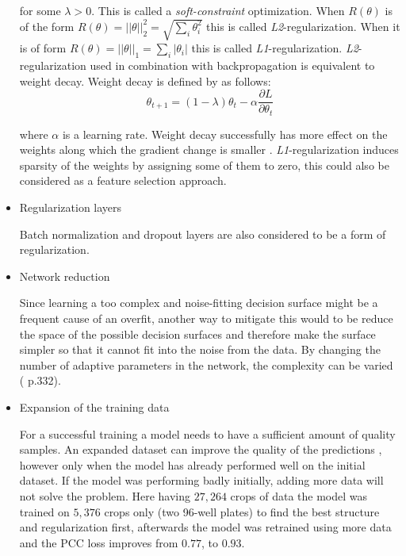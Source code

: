 \begin{itemize}
	for some $\lambda > 0$. This is called a \emph{soft-constraint} optimization. When $R(\theta)$ is of the form $R(\theta) = ||\theta||^2_2 = \sqrt{\sum\limits_i \theta_i^2}$ this is called \emph{L2}-regularization. When it is of form $R(\theta) = ||\theta||_1 = \sum\limits_i |\theta_i|$ this is called \emph{L1}-regularization. \emph{L2}-regularization used in combination with backpropagation is equivalent to weight decay. Weight decay is defined by \cite{Hanson_1988} as follows:
	\begin{equation}
		\theta_{t+1} = (1 - \lambda)\theta_t - \alpha \frac{\partial L}{\partial \theta_t}
	\end{equation}

	where $\alpha$ is a learning rate. Weight decay successfully has more effect on the weights along which the gradient change is smaller \cite{Goodfellow_2016}. \emph{L1}-regularization induces sparsity of the weights by assigning some of them to zero, this could also be considered as a feature selection approach.

	\item Regularization layers

	Batch normalization and dropout layers are also considered to be a form of regularization.

	\item Network reduction

	Since learning a too complex and noise-fitting decision surface might be a frequent cause of an overfit, another way to mitigate this would to be reduce the space of the possible decision surfaces and therefore make the surface simpler so that it cannot fit into the noise from the data. By changing the number of adaptive parameters in the network, the complexity can be varied (\cite{Bishop_2006} p.332).

	\item Expansion of the training data

	For a successful training a model needs to have a sufficient amount of quality samples. An expanded dataset can improve the quality of the predictions \cite{Ying_2019}, however only when the model has already performed well on the initial dataset. If the model was performing badly initially, adding more data will not solve the problem. Here having $27,264$ crops of data the model was trained on $5,376$ crops only (two 96-well plates) to find the best structure and regularization first, afterwards the model was retrained using more data and the PCC loss improves from $0.77$, to $0.93$.
\end{itemize}
